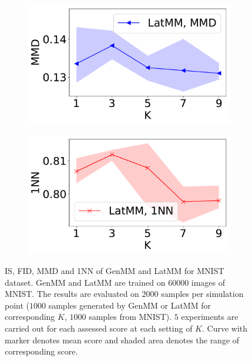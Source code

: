 \begin{figure}[!tp]
\begin{subfigure}{.24\textwidth}
  \end{subfigure}
  \centering
  \begin{subfigure}{.24\textwidth}
    \centering
    \includegraphics[width=1\linewidth]{images/mnist/scores/std1EMGM-SM/EMGM-SM-MMD-K.pdf}
  \end{subfigure}
  \begin{subfigure}{0.24\textwidth}
    \centering
    \includegraphics[width=1.\linewidth]{images/mnist/scores/std1EMGM-SM/EMGM-SM-1NN-K.pdf}
  \end{subfigure}
  \vspace{-0.35cm}
  \caption{IS, FID, MMD and 1NN of GenMM and LatMM for MNIST dataset. GenMM and LatMM are trained on $60000$ images of MNIST. The results are evaluated on $2000$ samples per simulation point ($1000$ samples generated by GenMM or LatMM for corresponding $K$, $1000$ samples from MNIST). $5$ experiments are carried out for each assessed score at each setting of $K$. Curve with marker denotes mean score and shaded area denotes the range of corresponding score.}\label{fig-scores-k}
  \vspace{-0.15cm}
\end{figure}

